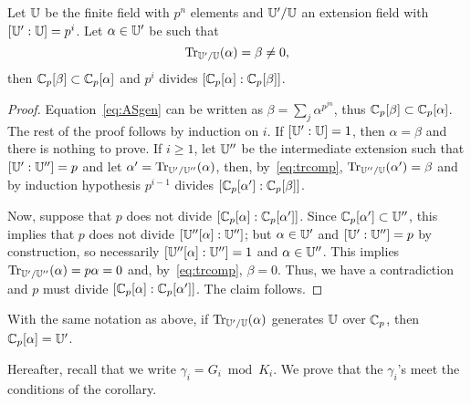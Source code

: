 \begin{lemma}
  Let $\mathbb{U}$ be the finite field with $p^n$ elements and $\mathbb{U}'/\mathbb{U}$ an
  extension field with $[\mathbb{U}':\mathbb{U}]=p^i$. Let $\alpha\in\mathbb{U}'$ be such that
  \begin{equation}
    \label{eq:ASgen}
    \operatorname{Tr}_{\mathbb{U}'/\mathbb{U}}(\alpha) = \beta \ne 0
    \text{,}
  \end{equation}
  then $\mathbb{C}_p[\beta]\subset\mathbb{C}_p[\alpha]$ and $p^i$ divides
  $\left[\mathbb{C}_p[\alpha]:\mathbb{C}_p[\beta]\right]$.
\end{lemma}
\begin{proof} Equation~\eqref{eq:ASgen} can be written as $\beta = \sum_j
\alpha^{p^{jn}}$, thus $\mathbb{C}_p[\beta] \subset \mathbb{C}_p[\alpha]$.  The rest
of the proof follows by induction on $i$. If $[\mathbb{U}':\mathbb{U}]=1$, then
$\alpha=\beta$ and there is nothing to prove. If $i\ge1$, let $\mathbb{U}''$
be the intermediate extension such that $[\mathbb{U}':\mathbb{U}'']=p$ and let
$\alpha'=\operatorname{Tr}_{\mathbb{U}'/\mathbb{U}''}(\alpha)$, then, by~\ref{eq:trcomp},
$\operatorname{Tr}_{\mathbb{U}''/\mathbb{U}}(\alpha') = \beta$ and by induction hypothesis $p^{i-1}$
divides $[\mathbb{C}_p[\alpha']:\mathbb{C}_p[\beta]]$.

Now, suppose that $p$ does not divide $[\mathbb{C}_p[\alpha]:\mathbb{C}_p[\alpha']]$.
Since $\mathbb{C}_p[\alpha']\subset\mathbb{U}''$, this implies that $p$ does not
divide $[\mathbb{U}''[\alpha]:\mathbb{U}'']$; but $\alpha\in\mathbb{U}'$ and $[\mathbb{U}':\mathbb{U}'']=p$ by
construction, so necessarily $[\mathbb{U}''[\alpha]:\mathbb{U}''] = 1$ and
$\alpha\in\mathbb{U}''$. This implies $\operatorname{Tr}_{\mathbb{U}'/\mathbb{U}''}(\alpha) = p\alpha = 0$
and, by~\ref{eq:trcomp}, $\beta=0$. Thus, we have a contradiction and
$p$ must divide $[\mathbb{C}_p[\alpha]:\mathbb{C}_p[\alpha']]$. The claim
follows.\end{proof}

\begin{corollary}
  \label{coro:gen}
  With the same notation as above, if $\operatorname{Tr}_{\mathbb{U}'/\mathbb{U}}(\alpha)$ generates
  $\mathbb{U}$ over $\mathbb{C}_p$, then $\mathbb{C}_p[\alpha] = \mathbb{U}'$.
\end{corollary}

Hereafter, recall that we write $\gamma_i=G_i \bmod K_i$. We prove
that the $\gamma_i$'s meet the conditions of the corollary.

